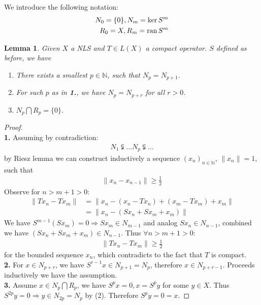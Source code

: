 \documentclass[a4paper,11pt,fleqn]{book}
\newtheorem{lemma}[theorem]{Lemma}
\theoremstyle{definition}
\theoremstyle{remark}
\begin{document}
We introduce the following notation:
\begin{align*}
	N_0 = \{0\}, N_m = \ker S^m\\
	R_0 = X, R_m = \operatorname{ran} S^m
\end{align*}

\begin{lemma}
	Given $X$ a NLS and $T \in L(X)$ a compact operator. $S$ defined as before, we have
	\begin{enumerate}
		\item There exists a smallest $p \in \mathbb{N}$, such that $N_p = N_{p+1}$. 
		\item For such $p$ as in \textbf{1.}, we have $N_{p} = N_{p + r}$ for all $r >0$.
		\item $N_p \bigcap R_p = \{0\}$.
	\end{enumerate}
\end{lemma}
\begin{proof}
	\quad\\
\textbf{1.} Assuming by contradiction:
\begin{align*}
	N_1 \subsetneqq \dots N_{p} \subsetneqq \dots
\end{align*}
by Riesz lemma we can construct inductively a sequence $(x_n)_{n \in \mathbb{N}}$, $\|x_n\| = 1$, such that
\begin{align*}
	\| x_n - x_{n-1}\| \geq \frac{1}{2}
\end{align*}
Observe for $n > m+1>0$:
\begin{align*}
	\|Tx_n - Tx_m \|  &= \|x_n - (x_n -Tx_n) + (x_m - Tx_m) + x_m\|\\
	&=  \|x_n - (S x_n + Sx_m + x_m) \|
\end{align*}
We have $S^{m-1}(Sx_m) = 0 \Rightarrow Sx_m \in N_{m -1}$ and analog $Sx_n \in N_{n-1}$, combined we have $(Sx_n + Sx_m + x_m) \in N_{n-1}$. Thus $\forall n > m+1 >0:$
\begin{align*}
	\|Tx_n - Tx_m\| \geq \frac{1}{2}
\end{align*} 
for the bounded sequence $x_n$, which contradicts to the fact that $T$ is compact.\\
\textbf{2.} For $x \in N_{p+ r}$, we have $S^{r -1}x \in N_{p+1} = N_p$, therefore $x \in N_{p+r -1}$. Proceeds inductively we have the assumption. \\
\textbf{3.} Assume $x \in N_p \bigcap R_p$, we have $S^p x = 0, x = S^p y $ for some $y \in X$. Thus $S^{2p}y = 0 \Rightarrow y \in N_{2p} = N_p$ by (2). Therefore $S^py = 0 = x$.
\end{proof}
\end{document}
